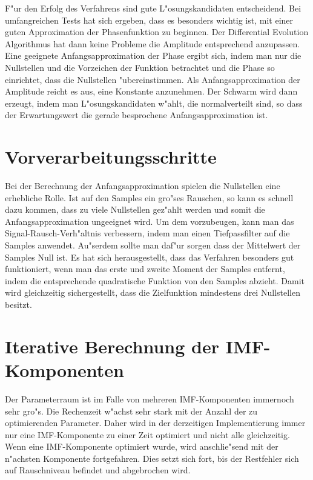 \documentclass[a4paper]{scrartcl}
\begin{document}
F"ur den Erfolg des Verfahrens sind gute L"osungskandidaten entscheidend. 
Bei umfangreichen Tests hat sich ergeben, dass es besonders wichtig ist, mit einer guten Approximation der Phasenfunktion zu beginnen. 
Der Differential Evolution Algorithmus hat dann keine Probleme die Amplitude entsprechend anzupassen. 
Eine geeignete Anfangsapproximation der Phase ergibt sich, indem man nur die Nullstellen und die Vorzeichen der Funktion betrachtet und die Phase so einrichtet, dass die Nullstellen "ubereinstimmen. 
Als Anfangsapproximation der Amplitude reicht es aus, eine Konstante anzunehmen. 
Der Schwarm wird dann erzeugt, indem man L"osungskandidaten w"ahlt, die normalverteilt sind, so dass der Erwartungswert die gerade besprochene Anfangsapproximation ist. 


\section{Vorverarbeitungsschritte}

Bei der Berechnung der Anfangsapproximation spielen die Nullstellen eine erhebliche Rolle. 
Ist auf den Samples ein gro"ses Rauschen, so kann es schnell dazu kommen, dass zu viele Nullstellen gez"ahlt werden und somit die Anfangsapproximation ungeeignet wird. 
Um dem vorzubeugen, kann man das Signal-Rausch-Verh"altnis verbessern, indem man einen Tiefpassfilter auf die Samples anwendet. 
Au"serdem sollte man daf"ur sorgen dass der Mittelwert der Samples Null ist. 
Es hat sich herausgestellt, dass das Verfahren besonders gut funktioniert, wenn man das erste und zweite Moment der Samples entfernt, indem die entsprechende quadratische Funktion von den Samples abzieht.
Damit wird gleichzeitig sichergestellt, dass die Zielfunktion mindestens drei Nullstellen besitzt. 


\section{Iterative Berechnung der IMF-Komponenten}

Der Parameterraum ist im Falle von mehreren IMF-Komponenten immernoch sehr gro"s. 
Die Rechenzeit w"achst sehr stark mit der Anzahl der zu optimierenden Parameter. 
Daher wird in der derzeitigen Implementierung immer nur eine IMF-Komponente zu einer Zeit optimiert und nicht alle gleichzeitig. 
Wenn eine IMF-Komponente optimiert wurde, wird anschlie"send mit der n"achsten Komponente fortgefahren. 
Dies setzt sich fort, bis der Restfehler sich auf Rauschniveau befindet und abgebrochen wird. 
\end{document}
